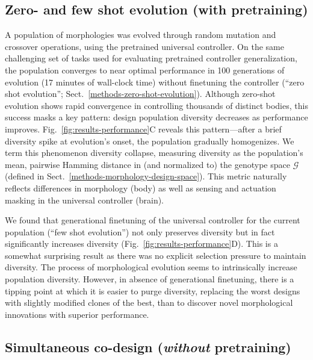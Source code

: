 

\subsection{Zero- and few shot evolution (with pretraining)}
\label{results-zero-and-few-shot-evolution}

A population of morphologies was evolved through random mutation and crossover operations, using the pretrained universal controller.
On the same challenging set of tasks used for evaluating pretrained controller generalization,
the population converges to near optimal performance
in 100 generations of evolution (17 minutes of wall-clock time)
without finetuning the controller (``zero shot evolution''; Sect.~\ref{methods-zero-shot-evolution}).
% 
Although zero-shot evolution shows rapid convergence in controlling thousands of distinct bodies, this success masks a key pattern: design population diversity decreases as performance improves. 
Fig.~\ref{fig:results-performance}C reveals this pattern---after a brief diversity spike at evolution's onset, the population gradually homogenizes. 
We term this phenomenon diversity collapse, measuring diversity as the population's mean, pairwise Hamming distance in (and normalized to) the genotype space $\mathcal{G}$ (defined in Sect.~\ref{methods-morphology-design-space}). This metric naturally reflects differences in morphology (body) as well as sensing and actuation masking in the universal controller (brain).

We found that generational finetuning of the universal controller for the current population (``few shot evolution'')
not only preserves diversity but in fact significantly increases diversity (Fig.~\ref{fig:results-performance}D).
This is a somewhat surprising result as there was no explicit selection pressure to maintain diversity.
The process of morphological evolution seems to intrinsically increase population diversity. 
However, in absence of generational finetuning, there is a tipping point at which it is easier to purge diversity, replacing the worst designs with slightly modified clones of the best, than to discover novel morphological innovations with superior performance.


\subsection{Simultaneous co-design (\textit{without} pretraining)}
\label{results-simultaneous-co-design}

